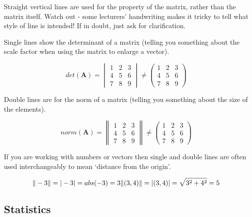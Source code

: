 \documentclass[
]{article}
\begin{document}
Straight vertical lines are used for the property of the matrix, rather
than the matrix itself. Watch out - some lecturers' handwriting makes it
tricky to tell what style of line is intended! If in doubt, just ask for
clarification.

Single lines show the determinant of a matrix (telling you something
about the scale factor when using the matrix to enlarge a vector).

\begin{equation}
det(\textbf{A}) = 
\begin{vmatrix}
1 & 2 & 3 \\
4 & 5 & 6 \\
7 & 8 & 9
\end{vmatrix}
\ne
\begin{pmatrix}
1 & 2 & 3 \\
4 & 5 & 6 \\
7 & 8 & 9
\end{pmatrix}
\end{equation}

Double lines are for the norm of a matrix (telling you something about
the size of the elements).

\begin{equation}
norm(\textbf{A}) = 
\begin{Vmatrix}
1 & 2 & 3 \\
4 & 5 & 6 \\
7 & 8 & 9
\end{Vmatrix}
\ne
\begin{pmatrix}
1 & 2 & 3 \\
4 & 5 & 6 \\
7 & 8 & 9
\end{pmatrix}
\end{equation}

If you are working with numbers or vectors then single and double lines
are often used interchangeably to mean `distance from the origin'.

\begin{equation}
\Vert -3 \Vert = \vert -3 \vert = abs(-3) = 3 \\
\Vert (3,4) \Vert = \vert (3,4) \vert =  \sqrt{3^2 + 4^2} = 5 \\
\end{equation}

\hypertarget{statistics}{%
\subsection{Statistics}\label{statistics}}
\end{document}
